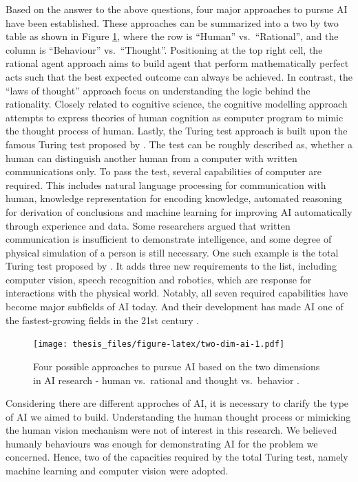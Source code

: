 \documentclass{monashthesis}
\theoremstyle{definition}
\theoremstyle{definition}
\theoremstyle{definition}
\theoremstyle{definition}
\theoremstyle{remark}
\begin{document}
Based on the answer to the above questions, four major approaches to pursue AI have been established. These approaches can be summarized into a two by two table as shown in Figure \ref{fig:two-dim-ai}, where the row is ``Human'' vs.~``Rational'', and the column is ``Behaviour'' vs.~``Thought''. Positioning at the top right cell, the rational agent approach aims to build agent that perform mathematically perfect acts such that the best expected outcome can always be achieved. In contrast, the ``laws of thought'' approach focus on understanding the logic behind the rationality. Closely related to cognitive science, the cognitive modelling approach attempts to express theories of human cognition as computer program to mimic the thought process of human. Lastly, the Turing test approach is built upon the famous Turing test proposed by \textcite{turing_computing_1950}. The test can be roughly described as, whether a human can distinguish another human from a computer with written communications only. To pass the test, several capabilities of computer are required. This includes natural language processing for communication with human, knowledge representation for encoding knowledge, automated reasoning for derivation of conclusions and machine learning for improving AI automatically through experience and data. Some researchers argued that written communication is insufficient to demonstrate intelligence, and some degree of physical simulation of a person is still necessary. One such example is the total Turing test proposed by \textcite{harnad_other_1991}. It adds three new requirements to the list, including computer vision, speech recognition and robotics, which are response for interactions with the physical world. Notably, all seven required capabilities have become major subfields of AI today. And their development has made AI one of the fastest-growing fields in the 21st century \autocite{russell_artificial_2002}.

\begin{figure}
\centering
\texttt{[image: thesis\_files/figure-latex/two-dim-ai-1.pdf]}
\caption{\label{fig:two-dim-ai}Four possible approaches to pursue AI based on the two dimensions in AI research - human vs.~rational and thought vs.~behavior \autocite{russell_artificial_2002}.}
\end{figure}

Considering there are different approches of AI, it is necessary to clarify the type of AI we aimed to build. Understanding the human thought process or mimicking the human vision mechanism were not of interest in this research. We believed humanly behaviours was enough for demonstrating AI for the problem we concerned. Hence, two of the capacities required by the total Turing test, namely machine learning and computer vision were adopted.
\end{document}
